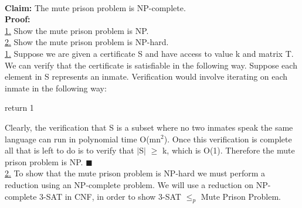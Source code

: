 \documentclass[10pt]{csc_assignment}
\begin{document}
\begin{description}

\newpage
\item[Q1. The Mute Prison]
~\\
\textbf{Claim:} The mute prison problem is NP-complete.\\
\textbf{Proof:}\\
\underline{1.} Show the mute prison problem is NP.\\
\underline{2.} Show the mute prison problem is NP-hard.\\

\underline{1.} Suppose we are given a certificate S and have access to value k and matrix T. We can verify that the certificate is satisfiable in the following way. Suppose each element in S represents an inmate. Verification would involve iterating on each inmate in the following way:\\
\begin{algorithm}[H]
 \LinesNumbered 
{}
return 1\;
\end{algorithm}
Clearly, the verification that S is a subset where no two inmates speak the same language can run in polynomial time O(mn$^{2}$). Once this verification is complete all that is left to do is to verify that $\mid$S$\mid$ $\geqslant$ k, which is O(1). Therefore the mute prison problem is NP. $\blacksquare$\\

\underline{2.} To show that the mute prison problem is NP-hard we must perform a reduction using an NP-complete problem. We will use a reduction on NP-complete 3-SAT in CNF, in order to show 3-SAT $\leqslant_{p}$ Mute Prison Problem.\\


\end{description}
\end{document}
